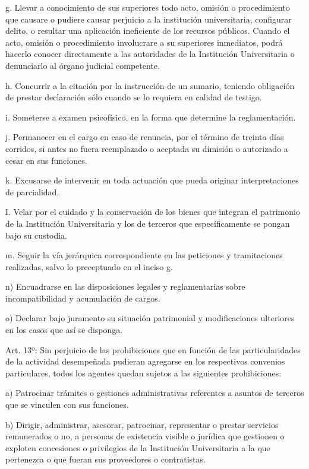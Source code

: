 \documentclass[]{article}
\begin{document}
g. Llevar a conocimiento de sus superiores todo acto, omisión o
procedimiento que causare o pudiere causar perjuicio a la institución
universitaria, configurar delito, o resultar una aplicación ineficiente
de los recursos públicos. Cuando el acto, omisión o procedimiento
involucrare a su superiores inmediatos, podrá hacerlo conocer
directamente a las autoridades de la Institución Universitaria o
denunciarlo al órgano judicial competente.

h. Concurrir a la citación por la instrucción de un sumario, teniendo
obligación de prestar declaración sólo cuando se lo requiera en calidad
de testigo.

i. Someterse a examen psicofísico, en la forma que determine la
reglamentación.

j. Permanecer en el cargo en caso de renuncia, por el término de treinta
días corridos, si antes no fuera reemplazado o aceptada su dimisión o
autorizado a cesar en sus funciones.

k. Excusarse de intervenir en toda actuación que pueda originar
interpretaciones de parcialidad.

I. Velar por el cuidado y la conservación de los bienes que integran el
patrimonio de la Institución Universitaria y los de terceros que
específicamente se pongan bajo su custodia.

m. Seguir la vía jerárquica correspondiente en las peticiones y
tramitaciones realizadas, salvo lo preceptuado en el inciso g.

n) Encuadrarse en las disposiciones legales y reglamentarias sobre
incompatibilidad y acumulación de cargos.

o) Declarar bajo juramento su situación patrimonial y modificaciones
ulteriores en los casos que así se disponga.

Art. 13º: Sin perjuicio de las prohibiciones que en función de las
particularidades de la actividad desempeñada pudieran agregarse en los
respectivos convenios particulares, todos los agentes quedan sujetos a
las siguientes prohibiciones:

a) Patrocinar trámites o gestiones administrativas referentes a asuntos
de terceros que se vinculen con sus funciones.

b) Dirigir, administrar, asesorar, patrocinar, representar o prestar
servicios remunerados o no, a personas de existencia visible o jurídica
que gestionen o exploten concesiones o privilegios de la Institución
Universitaria a la que pertenezca o que fueran sus proveedores o
contratistas.
\end{document}
